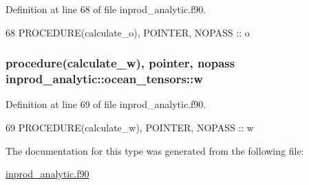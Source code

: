 Definition at line 68 of file inprod\+\_\+analytic.\+f90.


\begin{DoxyCode}
68      \textcolor{keywordtype}{PROCEDURE}(calculate\_o), \textcolor{keywordtype}{POINTER}, \textcolor{keywordtype}{NOPASS} :: o
\end{DoxyCode}
\subsubsection[{\texorpdfstring{w}{w}}]{\setlength{\rightskip}{0pt plus 5cm}procedure({\bf calculate\+\_\+w}), pointer, nopass inprod\+\_\+analytic\+::ocean\+\_\+tensors\+::w\hspace{0.3cm}{\ttfamily [private]}}\hypertarget{structinprod__analytic_1_1ocean__tensors_ad14f4b5bea84f71ecb4f6665b15e78f1}{}\label{structinprod__analytic_1_1ocean__tensors_ad14f4b5bea84f71ecb4f6665b15e78f1}


Definition at line 69 of file inprod\+\_\+analytic.\+f90.


\begin{DoxyCode}
69      \textcolor{keywordtype}{PROCEDURE}(calculate\_w), \textcolor{keywordtype}{POINTER}, \textcolor{keywordtype}{NOPASS} :: w
\end{DoxyCode}


The documentation for this type was generated from the following file\+:\begin{DoxyCompactItemize}
\item 
\hyperlink{inprod__analytic_8f90}{inprod\+\_\+analytic.\+f90}\end{DoxyCompactItemize}
